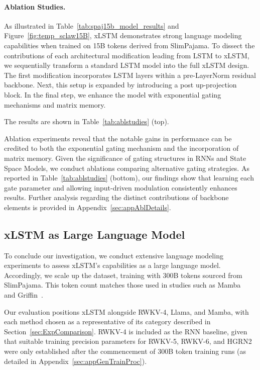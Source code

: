 \paragraph{Ablation Studies.}
As illustrated in Table~\ref{tab:spaj15b_model_results} and Figure~\ref{fig:temp_sclaw15B}, xLSTM demonstrates strong language modeling capabilities when trained on 15B tokens derived from SlimPajama. To dissect the contributions of each architectural modification leading from LSTM to xLSTM, we sequentially transform a standard LSTM model into the full xLSTM design. The first modification incorporates LSTM layers within a pre-LayerNorm residual backbone. Next, this setup is expanded by introducing a post up-projection block. In the final step, we enhance the model with exponential gating mechanisms and matrix memory.

The results are shown in Table~\ref{tab:ablstudies} (top). 

Ablation experiments reveal that the notable gains in performance can be credited to both the exponential gating mechanism and the incorporation of matrix memory. Given the significance of gating structures in RNNs and State Space Models, we conduct ablations comparing alternative gating strategies. As reported in Table~\ref{tab:ablstudies} (bottom), our findings show that learning each gate parameter and allowing input-driven modulation consistently enhances results. Further analysis regarding the distinct contributions of backbone elements is provided in Appendix~\ref{sec:appAblDetails}.

\subsection{xLSTM as Large Language Model}
\label{sec:ExpLanguage}

To conclude our investigation, we conduct extensive language modeling experiments to assess xLSTM’s capabilities as a large language model. Accordingly, we scale up the dataset, training with 300B tokens sourced from SlimPajama. This token count matches those used in studies such as Mamba~\citep{Gu:24arxiv} and Griffin~\citep{De:24arxiv}.

Our evaluation positions xLSTM alongside RWKV-4, Llama, and Mamba, with each method chosen as a representative of its category described in Section~\ref{sec:ExpComparison}. RWKV-4 is included as the RNN baseline, given that suitable training precision parameters for RWKV-5, RWKV-6, and HGRN2 were only established after the commencement of 300B token training runs (as detailed in Appendix~\ref{sec:appGenTrainProc}). 

